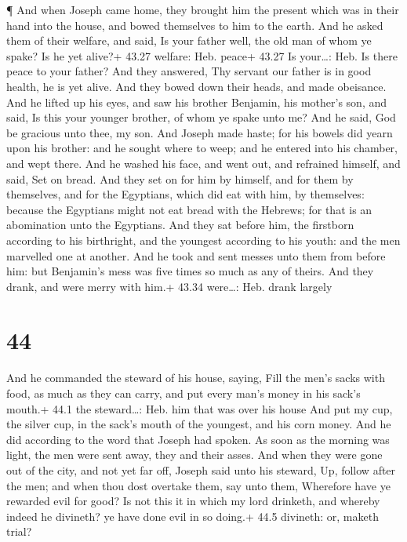  ¶ And when Joseph came home, they brought him the present
which was in their hand into the house, and bowed themselves to him to
the earth.  And he asked them of their welfare, and said,
Is your father well, the old man of whom ye spake? Is he yet alive?+
43.27 welfare: Heb. peace+ 43.27 Is your\ldots: Heb. Is there peace to
your father?  And they answered, Thy servant our father is
in good health, he is yet alive. And they bowed down their heads, and
made obeisance.  And he lifted up his eyes, and saw his
brother Benjamin, his mother's son, and said, Is this your younger
brother, of whom ye spake unto me? And he said, God be gracious unto
thee, my son.  And Joseph made haste; for his bowels did
yearn upon his brother: and he sought where to weep; and he entered into
his chamber, and wept there.  And he washed his face, and
went out, and refrained himself, and said, Set on bread. 
And they set on for him by himself, and for them by themselves, and for
the Egyptians, which did eat with him, by themselves: because the
Egyptians might not eat bread with the Hebrews; for that is an
abomination unto the Egyptians.  And they sat before him,
the firstborn according to his birthright, and the youngest according to
his youth: and the men marvelled one at another.  And he
took and sent messes unto them from before him: but Benjamin's mess was
five times so much as any of theirs. And they drank, and were merry with
him.+ 43.34 were\ldots: Heb. drank largely

\hypertarget{section-43}{%
\section{44}\label{section-43}}

 And he commanded the steward of his house, saying, Fill the
men's sacks with food, as much as they can carry, and put every man's
money in his sack's mouth.+ 44.1 the steward\ldots: Heb. him that was
over his house  And put my cup, the silver cup, in the
sack's mouth of the youngest, and his corn money. And he did according
to the word that Joseph had spoken.  As soon as the morning
was light, the men were sent away, they and their asses. 
And when they were gone out of the city, and not yet far off, Joseph
said unto his steward, Up, follow after the men; and when thou dost
overtake them, say unto them, Wherefore have ye rewarded evil for good?
 Is not this it in which my lord drinketh, and whereby
indeed he divineth? ye have done evil in so doing.+ 44.5 divineth: or,
maketh trial?

